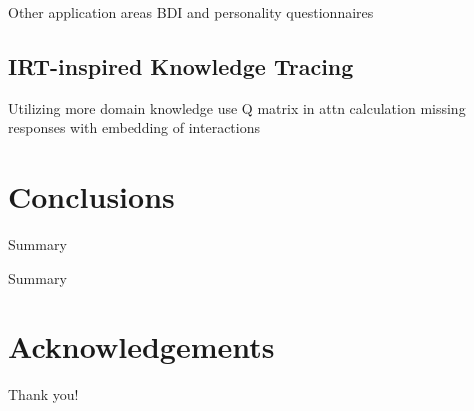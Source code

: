 \documentclass{beamer}
\theoremstyle{definition}
\begin{document}
\begin{frame}{Other application areas}
  BDI and personality questionnaires
\end{frame}

\subsection{IRT-inspired Knowledge Tracing}
\begin{frame}{Utilizing more domain knowledge}
  use Q matrix in attn calculation
  missing responses with embedding of interactions
\end{frame}


\section{Conclusions}
\begin{frame}{Summary}
  
\end{frame}

\begin{frame}{Summary}
  
\end{frame}

\section*{Acknowledgements}
\begin{frame}{Thank you!}
  
\end{frame}
\end{document}
